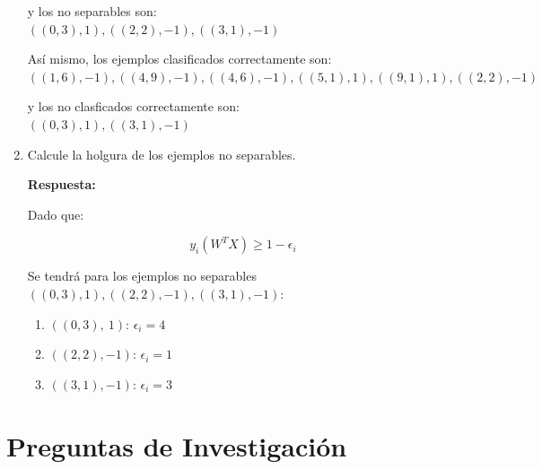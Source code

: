 \documentclass[paper=a4, fontsize=11pt]{scrartcl}
\numberwithin{equation}{section}		%
\numberwithin{figure}{section}			%
\numberwithin{table}{section}				%
\begin{document}
\begin{enumerate}
    y los no separables son:\\
    ${((0,3),1), ((2,2),-1), ((3,1),-1)}$
    
    Así mismo, los ejemplos clasificados correctamente son:\\
    ${((1,6),-1), ((4,9),-1), ((4,6),-1), ((5,1),1), ((9,1),1)}, ((2,2),-1)$
    
    y los no clasficados correctamente son:\\
    ${((0,3),1), ((3,1),-1)}$\\
    
    \item Calcule la holgura de los ejemplos no separables.
    
    \textbf{Respuesta:}
    
    Dado que:
    
    $$y_i(W^TX)\geq 1 - \epsilon_i$$
    
    Se tendrá para los ejemplos no separables ${((0,3),1), ((2,2),-1), ((3,1),-1)}$:
    
    \begin{enumerate}
        \item $((0,3),\ 1)$: $\epsilon_i = 4$
        \item $((2,2),-1)$: $\epsilon_i = 1$
        \item $((3,1),-1)$: $\epsilon_i = 3$
    \end{enumerate}

\end{enumerate}
\newpage
\section{Preguntas de Investigación}
\end{document}
